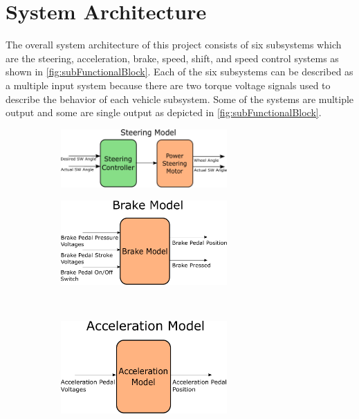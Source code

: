 \documentclass[letterpaper,12pt]{article}   %
\begin{document}
\section{System Architecture}
The overall system architecture of this project consists of six subsystems which are the steering, acceleration, brake, speed, shift, and speed control systems as shown in \autoref{fig:subFunctionalBlock}. Each of the six subsystems can be described as a multiple input system because there are two torque voltage signals used to describe the behavior of each vehicle subsystem. Some of the systems are multiple output and some are single output as depicted in \autoref{fig:subFunctionalBlock}. %
%
\begin{figure}[htb]
    \centering 
\begin{subfigure}[b]{0.48\linewidth}
  \centering 
  \includegraphics[width=2.5in]{figs/inkscape/steeringmodelarchitecture}
  \caption{}
  \label{fig:steeringmodelarchitecture}
\end{subfigure}
\begin{subfigure}[b]{0.48\linewidth}
  \centering
  \includegraphics[width=2.5in]{figs/inkscape/brakeModelArchitecture}
  \caption{}
  \label{fig:brakeModelArchitecture}
\end{subfigure}
\\
\begin{subfigure}[b]{0.48\textwidth}
  \centering 
  \includegraphics[width=2.5in]{figs/inkscape/accelerationModelArchitecture}
  \caption{}
  \label{fig:accelerationModelArchitecture}
\end{subfigure}

\end{figure}
\end{document}
